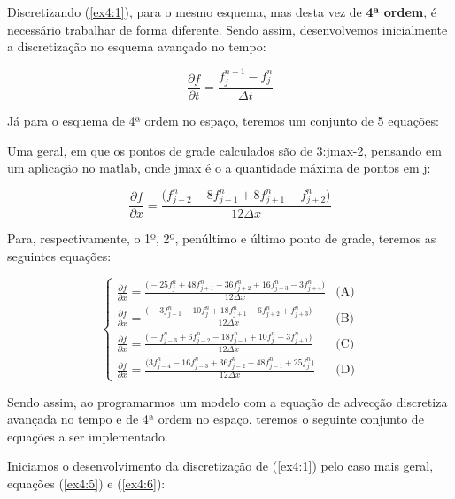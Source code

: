 \documentclass[11pt]{article}
\begin{document}
Discretizando (\ref{ex4:1}), para o mesmo esquema, mas desta vez de
\textbf{4ª ordem}, é necessário trabalhar de forma diferente. Sendo
assim, desenvolvemos inicialmente a discretização no esquema avançado no
tempo:

\begin{equation}
    \frac{\partial{f}}{\partial{t}} = \frac{f^{n+1}_{j} - f^{n}_{j}}{\Delta{t}}
    \label{ex4:5}
\end{equation}

Já para o esquema de 4ª ordem no espaço, teremos um conjunto de 5
equações:

Uma geral, em que os pontos de grade calculados são de 3:jmax-2,
pensando em um aplicação no matlab, onde jmax é o a quantidade máxima de
pontos em j:

\begin{equation}
    \frac{\partial{f}}{\partial{x}} = \frac{\biggl( f^{n}_{j-2} - 8f^{n}_{j-1} + 8f^{n}_{j+1} - f^{n}_{j+2} 
    \bigg)}{12\Delta{x}}
    \label{ex4:6}
\end{equation}

Para, respectivamente, o 1º, 2º, penúltimo e último ponto de grade,
teremos as seguintes equações:

\begin{equation}
\begin{cases}
    \frac{\partial{f}}{\partial{x}} = \frac{\biggl( - 25f^{n}_{j} + 48f^{n}_{j+1} - 36f^{n}_{j+2} + 16f^{n}_{j+3} - 3f^{n}_{j+4} \bigg)}{12\Delta{x}} & \text{(A)}\\
    \frac{\partial{f}}{\partial{x}} = \frac{\biggl( - 3f^{n}_{j-1} - 10f^{n}_{j} + 18f^{n}_{j+1} - 6f^{n}_{j+2} + f^{n}_{j+3} \bigg)}{12\Delta{x}} & \text{(B)}\\
    \frac{\partial{f}}{\partial{x}} = \frac{\biggl( - f^{n}_{j-3} + 6f^{n}_{j-2} - 18f^{n}_{j-1} + 10f^{n}_{j} + 3f^{n}_{j+1} \bigg)}{12\Delta{x}} & \text{(C)}\\
    \frac{\partial{f}}{\partial{x}} = \frac{\biggl( 3f^{n}_{j-4} - 16f^{n}_{j-3} + 36f^{n}_{j-2} - 48f^{n}_{j-1} + 25f^{n}_{j} \bigg)}{12\Delta{x}} & \text{(D)}
    \label{ex4:7}
\end{cases}
\end{equation}

Sendo assim, ao programarmos um modelo com a equação de advecção
discretiza avançada no tempo e de 4ª ordem no espaço, teremos o seguinte
conjunto de equações a ser implementado.

Iniciamos o desenvolvimento da discretização de (\ref{ex4:1}) pelo caso
mais geral, equações (\ref{ex4:5}) e (\ref{ex4:6}):
\end{document}
